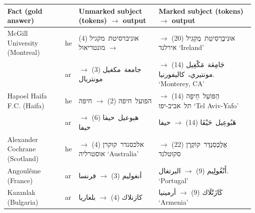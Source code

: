\documentclass[11pt]{article}
\newcommand{\he}[1]{\mbox{\beginR\hebfont #1\endR}}
\newcommand{\ar}[1]{\mbox{\beginR\arabfont #1\endR}}
\newcommand{\cmark}{\textcolor{good}{\ding{51}}}
\newcommand{\xmark}{\textcolor{bad}{\ding{55}}}
\begin{document}


\appendix

\begin{table}[t]
\centering\footnotesize
\setlength{\tabcolsep}{6pt}
\renewcommand{\arraystretch}{1.15}
\begin{tabular}{@{}llll@{}}
\toprule
Fact (gold answer) & & Unmarked subject (tokens) $\rightarrow$ output & Marked subject (tokens) $\rightarrow$ output\\
\midrule
McGill University (Montreal) & he & \makecell[l]{\he{אוניברסיטת מקגיל} (4)\\[-1pt]$\rightarrow$ \he{מונטריאול} \cmark} & \makecell[l]{\he{אוּנִיבֶרְסִיטַת מֶקְגִיל} (20)\\[-1pt]$\rightarrow$ \he{אירלנד} `Ireland' \xmark}\\
 & ar & \makecell[l]{\ar{جامعة مكغيل} (3)\\[-1pt]$\rightarrow$ \ar{مونتريال} \cmark} & \makecell[l]{\ar{جَامِعَة مَكْغِيل} (14)\\[-1pt]$\rightarrow$ \ar{مونتيري، كاليفورنيا.} `Monterey, CA' \xmark}\\\addlinespace[2pt]
Hapoel Haifa F.C. (Haifa) & he & \makecell[l]{\he{הפועל חיפה} (2)\\[-1pt]$\rightarrow$ \he{חיפה} \cmark} & \makecell[l]{\he{הַפּוֹעֵל חֵיפָה} (14)\\[-1pt]$\rightarrow$ \he{תל אביב-יפו} `Tel Aviv-Yafo' \xmark}\\
 & ar & \makecell[l]{\ar{هبوعيل حيفا} (6)\\[-1pt]$\rightarrow$ \ar{حيفا} \cmark} & \makecell[l]{\ar{هَبُوعِيل حَيْفَا} (14)\\[-1pt]$\rightarrow$ \ar{حيفا} \cmark}\\\addlinespace[2pt]
Alexander Cochrane (Scotland) & he & \makecell[l]{\he{אלכסנדר קוקרן} (4)\\[-1pt]$\rightarrow$ \he{אוסטרליה} `Australia' \xmark} & \makecell[l]{\he{אֲלֶכְּסַנְדֶּר קוֹקְרֶן} (22)\\[-1pt]$\rightarrow$ \he{סקוטלנד} \cmark}\\\addlinespace[2pt]
Angoul\^eme (France) & ar & \makecell[l]{\ar{أنغوليم} (3)\\[-1pt]$\rightarrow$ \ar{فرنسا} \cmark} & \makecell[l]{\ar{أَنْغُولِيم} (9)\\[-1pt]$\rightarrow$ \ar{البرتغال.} `Portugal' \xmark}\\
Kazanlak (Bulgaria) & ar & \makecell[l]{\ar{كازنلاك} (4)\\[-1pt]$\rightarrow$ \ar{بلغاريا} \cmark} & \makecell[l]{\ar{كَازَنْلَاك} (9)\\[-1pt]$\rightarrow$ \ar{أرمينيا} `Armenia' \xmark}\\

\end{tabular}
\end{table}
\end{document}
